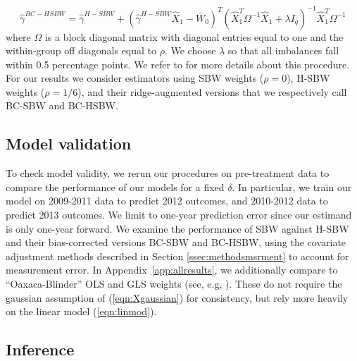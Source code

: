 \documentclass[aoas]{imsart}
\theoremstyle{plain}
\theoremstyle{remark}
\begin{document}
\begin{equation}
\hat{\gamma}^{BC-HSBW} = \hat{\gamma}^{H-SBW} + (\hat{\gamma}^{H-SBW}\hat{X}_1 - \bar{W}_0)^T(\hat{X}_1^T\Omega^{-1}\hat{X}_1 + \lambda I_q)^{-1}\hat{X}_1^T\Omega^{-1}
\end{equation}
%
where $\Omega$ is a block diagonal matrix with diagonal entries equal to one and the within-group off diagonals equal to $\rho$. We choose $\lambda$ so that all imbalances fall within 0.5 percentage points. We refer to \cite{ben2021augmented} for more details about this procedure. For our results we consider estimators using SBW weights ($\rho = 0$), H-SBW weights ($\rho = 1/6$), and their ridge-augmented versions that we respectively call BC-SBW and BC-HSBW.

\subsection{Model validation}

To check model validity, we rerun our procedures on pre-treatment data to compare the performance of our models for a fixed $\delta$. In particular, we train our model on 2009-2011 data to predict 2012 outcomes, and 2010-2012 data to predict 2013 outcomes. We limit to one-year prediction error since our estimand is only one-year forward. We examine the performance of SBW against H-SBW and their bias-corrected versions BC-SBW and BC-HSBW, using the covariate adjustment methods described in Section \ref{ssec:methodsmsrment} to account for measurement error. In Appendix~\ref{app:allresults}, we additionally compare to ``Oaxaca-Blinder'' OLS and GLS weights (see, e.g, \cite{kline2011oaxaca}). These do not require the gaussian assumption of (\ref{eqn:Xgaussian}) for consistency, but rely more heavily on the linear model (\ref{eqn:linmod}).

\subsection{Inference}
\end{document}
